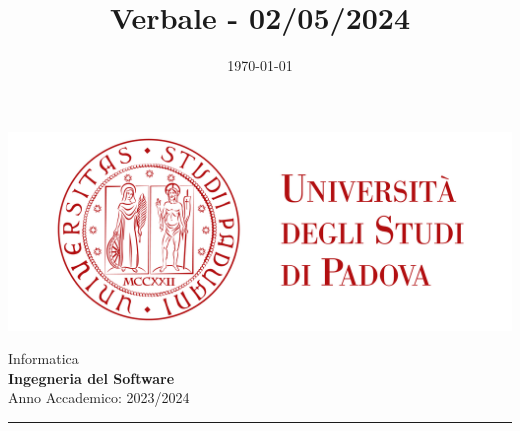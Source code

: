 \documentclass[5pt]{article}
\title{ Verbale - 02/05/2024 }
\date{\today}
\begin{document}


    \vspace{8pt}
    \includegraphics[scale=0.2]{UNIPDFull.png}

\vspace{10pt}

\begin{minipage}[t]{0.48\textwidth}
        \begin{flushleft}
            Informatica\\
            \vspace{5pt}
            \textbf{\LARGE Ingegneria del Software}\\
            Anno Accademico: 2023/2024
        \end{flushleft}
\end{minipage}


\vspace{5px}


\rule{\textwidth}{5pt}
\end{document}
